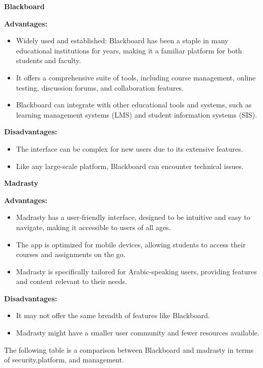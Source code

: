 \documentclass[a4paper,12pt]{article}
\begin{document}
\textbf{Blackboard}

\textbf{Advantages:}
\begin{itemize}
    \item Widely used and established: Blackboard has been a staple in many
educational institutions for years, making it a familiar platform for both
students and faculty.
    \item It offers a comprehensive suite of tools, including course management,
online testing, discussion forums, and collaboration features.
    \item Blackboard can integrate with other educational tools and systems, such as
learning management systems (LMS) and student information systems
(SIS).
\end{itemize}

\textbf{Disadvantages:}
\begin{itemize}
    \item The interface can be complex for new users due to its extensive features.
    \item Like any large-scale platform, Blackboard can encounter technical issues.
\end{itemize}
\newpage
\textbf{Madrasty}

\textbf{Advantages:}
\begin{itemize}
    \item Madrasty has a user-friendly interface, designed to be intuitive and easy to
navigate, making it accessible to users of all ages.
    \item The app is optimized for mobile devices, allowing students to access their
courses and assignments on the go.
    \item Madrasty is specifically tailored for Arabic-speaking users, providing
features and content relevant to their needs.
\end{itemize}

\textbf{Disadvantages:}
\begin{itemize}
    \item It may not offer the same breadth of features like Blackboard.

    \item Madrasty might have a smaller user community and fewer resources
available.
\end{itemize}
\newpage
The following table is a comparison between Blackboard and madrasty in terms of security,platform, and management.\newline
\end{document}
